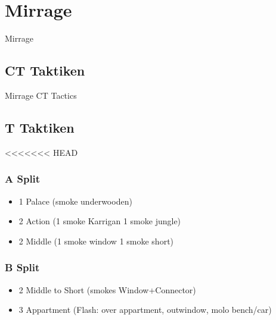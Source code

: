 \newpage




\chapter{Mirrage}
\label{chap:mirrage}
Mirrage

\section{CT Taktiken}
\label{sect:mirrage_ct}
Mirrage CT Tactics

\section{T Taktiken}
<<<<<<< HEAD
\label{sect:Mirrage_t}
\subsection{A Split}
\label{subsect:mirrage_a_split}
\begin{itemize}
\item 1 Palace (smoke underwooden)
\item 2 Action (1 smoke Karrigan 1 smoke jungle)
\item 2 Middle (1 smoke window 1 smoke short)
\end{itemize}

\subsection{B Split}
\label{subsect:mirrage_b_split}
\begin{itemize}
\item 2 Middle to Short (smokes Window+Connector)
\item 3 Appartment (Flash: over appartment, outwindow, molo bench/car)
\end{itemize}




